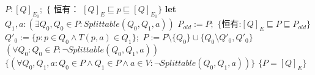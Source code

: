 \begin{algorithm}
    \caption{}\label{al:4-6}
    \begin{algorithmic}[1]
        \State $P:[Q]_{E_0};$  
        \State $\{$ 恒有： $[Q]_E \sqsubseteq p \sqsubseteq [Q]_{E_0} \}$
            \State \textbf{let} $Q_1 ,a : ( \exists Q_0,Q_0 \in P : Splittable (Q_0,Q_1,a))$
            \State $ P_{old} := P ; $
            \State $\{ \mbox{恒有:} [Q]_E \sqsubseteq P \sqsubseteq P_{old} \}$
                \State $ Q'_0 := \{  p:p \in Q_0 \land T(p,a) \in Q_1 \} ; $
                \State $ P:= P \setminus \{  Q_0 \} \cup \{ Q_0 \setminus Q'_0,Q'_0   \} $
            \EndFor
            \State $ (\forall Q_0:Q_0 \in P : \neg Splittable ( Q_0,Q_1,a)) $ 
        \Until 
        \State $ \{ (\forall Q_0,Q_1,a : Q_0 \in P \land Q_1 \in P \land a \in V : \neg Splittable (Q_0,Q_1,a))  \} $
        \State $\{  P = [Q]_E \}$
    \end{algorithmic}
\end{algorithm}

